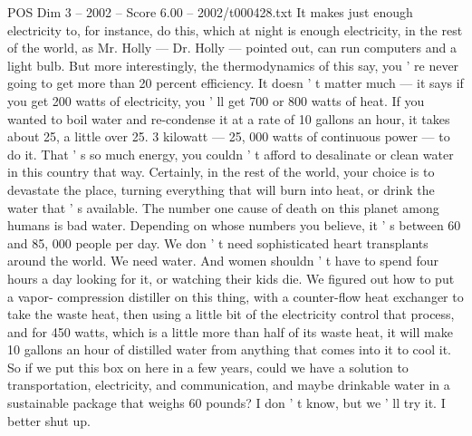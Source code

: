 \begin{textsample}{POS Dim 3 – 2002 – Score 6.00 – 2002/t000428.txt}
It makes just enough electricity to, for instance, do this, which at night is enough electricity, in the rest of the world, as Mr.
Holly — Dr.
Holly — pointed out, can run computers and a light bulb.
But more interestingly, the thermodynamics of this say, you ' re never going to get more than 20 percent efficiency.
It doesn ' t matter much — it says if you get 200 watts of electricity, you ' ll get 700 or 800 watts of heat.
If you wanted to boil water and re-condense it at a rate of 10 gallons an hour, it takes about 25, a little over 25. 3 kilowatt — 25, 000 watts of continuous power — to do it.
That ' s so much energy, you couldn ' t afford to desalinate or clean water in this country that way.
Certainly, in the rest of the world, your choice is to devastate the place, turning everything that will burn into heat, or drink the water that ' s available.
The number one cause of death on this planet among humans is bad water.
Depending on whose numbers you believe, it ' s between 60 and 85, 000 people per day.
We don ' t need sophisticated heart transplants around the world.
We need water.
And women shouldn ' t have to spend four hours a day looking for it, or watching their kids die.
We figured out how to put a vapor- compression distiller on this thing, with a counter-flow heat exchanger to take the waste heat, then using a little bit of the electricity control that process, and for 450 watts, which is a little more than half of its waste heat, it will make 10 gallons an hour of distilled water from anything that comes into it to cool it.
So if we put this box on here in a few years, could we have a solution to transportation, electricity, and communication, and maybe drinkable water in a sustainable package that weighs 60 pounds?
I don ' t know, but we ' ll try it.
I better shut up.

\end{textsample}
